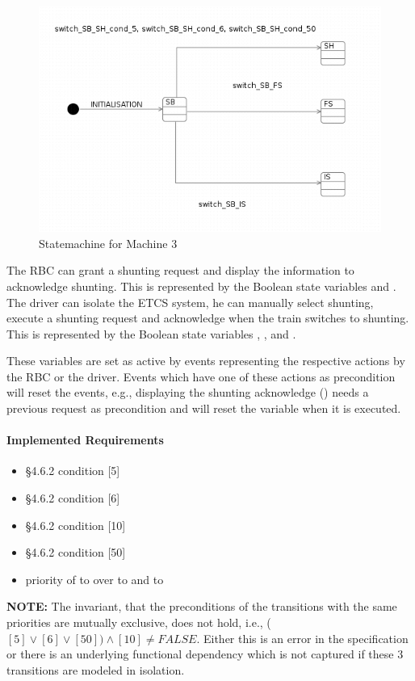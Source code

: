 \documentclass{template/openetcs_article}
\begin{document}
\begin{figure}[ht]
  \centering
  \includegraphics[width=.75\textwidth]{statechart4}
  \caption{Statemachine for Machine 3}
  \label{fig:statemachine-m3}
\end{figure}



The RBC can grant a shunting request and display the information to acknowledge
shunting. This is represented by the Boolean state variables
 and . The driver can
isolate the ETCS system, he can manually select shunting, execute a shunting
request and acknowledge when the train switches to shunting. This is represented
by the Boolean state variables ,
,  and
.

These variables are set as active by events representing the respective actions
by the RBC or the driver. Events which have one of these actions as precondition
will reset the events, e.g., displaying the shunting acknowledge
() needs a previous request as precondition and
will reset the variable  when it is executed.

\paragraph{Implemented Requirements}
\label{sec:impl-requ-1}

\begin{itemize}
\item §4.6.2 condition [5]
\item §4.6.2 condition [6]
\item §4.6.2 condition [10]
\item §4.6.2 condition [50]
\item priority of  to  over  to  and
   to 
\end{itemize}

{\bf NOTE:} The invariant, that the preconditions of the transitions with the
same priorities are mutually exclusive, does not hold, i.e., ($[5] \vee [6] \vee
[50]) \wedge [10] \neq FALSE$. Either this is an error in the specification or
there is an underlying functional dependency which is not captured if these 3
transitions are modeled in isolation.


\end{document}
